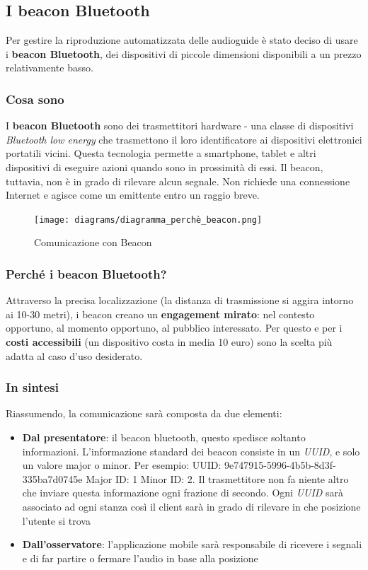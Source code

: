 \subsection{I beacon Bluetooth}
Per gestire la riproduzione automatizzata delle audioguide è stato deciso di usare i \textbf{beacon Bluetooth}, dei dispositivi di piccole dimensioni disponibili a un prezzo relativamente basso. 

\subsubsection{Cosa sono}
I \textbf{beacon Bluetooth} sono dei trasmettitori hardware - una classe di dispositivi \emph{Bluetooth low energy} che trasmettono il loro identificatore ai dispositivi elettronici portatili vicini. Questa tecnologia permette a smartphone, tablet e altri dispositivi di eseguire azioni quando sono in prossimità di essi. Il beacon, tuttavia, non è in grado di rilevare alcun segnale. Non richiede una connessione Internet e agisce come un emittente entro un raggio breve.\cite{what_are_beacons}


\begin{center}
\begin{figure}[htp]
    \centering
    \texttt{[image: diagrams/diagramma\_perchè\_beacon.png]}
    \caption{Comunicazione con Beacon}
    \label{fig:comunicazione_beacon}
\end{figure}
\end{center}

\subsubsection{Perché i beacon Bluetooth?}
Attraverso la precisa localizzazione (la distanza di trasmissione si aggira intorno ai 10-30 metri), i beacon creano un \textbf{engagement mirato}: nel contesto opportuno, al momento opportuno, al pubblico interessato. Per questo e per i \textbf{costi accessibili} (un dispositivo costa in media 10 euro) sono la scelta più adatta al caso d'uso desiderato.

\subsubsection{In sintesi}
Riassumendo, la comunicazione sarà composta da due elementi:
\begin{itemize}
    \item \textbf{Dal presentatore}: il beacon bluetooth, questo spedisce soltanto informazioni. L’informazione standard dei beacon consiste in un \emph{UUID}, e solo un valore major o minor. Per
    esempio: UUID: 9e747915-5996-4b5b-8d3f-335ba7d0745e Major ID: 1 Minor ID: 2. Il trasmettitore non fa niente altro che inviare questa informazione ogni frazione di secondo. Ogni \emph{UUID} sarà associato ad ogni stanza così il client sarà in grado di rilevare in che posizione l'utente si trova
    \item \textbf{Dall'osservatore}: l'applicazione mobile sarà responsabile di ricevere i segnali e di far partire o fermare l'audio in base alla posizione
\end{itemize}

